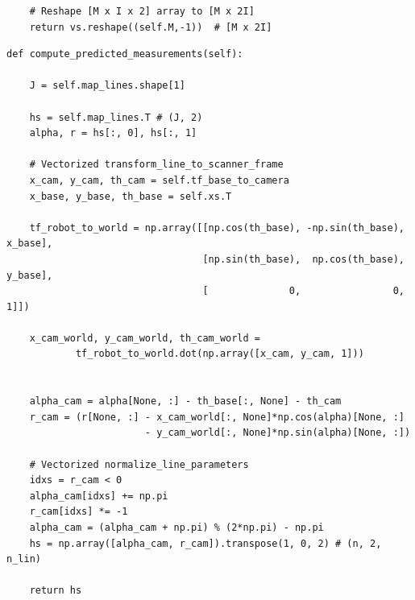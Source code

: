 \documentclass{article}
\begin{document}
\begin{enumerate}[label=(\roman*)]
\begin{verbatim}
    # Reshape [M x I x 2] array to [M x 2I]
    return vs.reshape((self.M,-1))  # [M x 2I]

\end{verbatim}
\newpage
\begin{verbatim}
def compute_predicted_measurements(self):
    
    J = self.map_lines.shape[1]

    hs = self.map_lines.T # (J, 2)
    alpha, r = hs[:, 0], hs[:, 1]

    # Vectorized transform_line_to_scanner_frame
    x_cam, y_cam, th_cam = self.tf_base_to_camera
    x_base, y_base, th_base = self.xs.T

    tf_robot_to_world = np.array([[np.cos(th_base), -np.sin(th_base), x_base],
                                  [np.sin(th_base),  np.cos(th_base), y_base], 
                                  [              0,                0,      1]])
    
    x_cam_world, y_cam_world, th_cam_world =
            tf_robot_to_world.dot(np.array([x_cam, y_cam, 1]))


    alpha_cam = alpha[None, :] - th_base[:, None] - th_cam
    r_cam = (r[None, :] - x_cam_world[:, None]*np.cos(alpha)[None, :]
                        - y_cam_world[:, None]*np.sin(alpha)[None, :])
    
    # Vectorized normalize_line_parameters
    idxs = r_cam < 0
    alpha_cam[idxs] += np.pi
    r_cam[idxs] *= -1
    alpha_cam = (alpha_cam + np.pi) % (2*np.pi) - np.pi
    hs = np.array([alpha_cam, r_cam]).transpose(1, 0, 2) # (n, 2, n_lin)

    return hs

\end{verbatim}

\end{enumerate}
\end{document}
